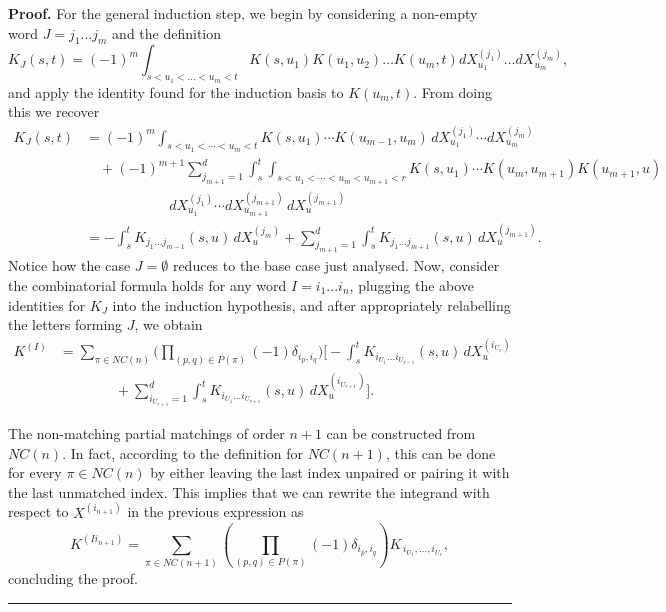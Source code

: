 \documentclass{article}%
\newenvironment{proof}[1][Proof]{\noindent\textbf{#1.} }{\ \rule{0.5em}{0.5em}}
\begin{document}
\begin{proof}
For the general induction step, we begin by considering a non-empty word $J = j_1 \dots j_m$ and the definition
\[
K_{J}(s,t) = (-1)^{m} \int_{s < u_1 < \dots < u_m <t} K(s, u_1)K(u_1, u_2) \dots K(u_{m}, t) dX^{(j_1)}_{u_1}\dots dX^{(j_m)}_{u_m},
\]
and apply the identity found for the induction basis to $K(u_m, t)$. From doing this we recover
\begin{align*}
K_{J}(s,t) &= (-1)^{m}
   \int_{s<u_1<\cdots<u_m<t}
   K(s,u_1)\cdots K(u_{m-1},u_{m})\,
   dX^{(j_1)}_{u_1}\cdots dX^{(j_m)}_{u_m} \\
&\quad
   + (-1)^{m+1}
   \sum_{j_{m+1}=1}^d
   \int_s^t
   \int_{s<u_1<\cdots<u_m<u_{m+1}<r}
   K(s,u_1)\cdots K(u_m,u_{m+1}) K(u_{m+1},u) \\
&\hspace{6em}
   dX^{(j_1)}_{u_1}\cdots dX^{(j_{m+1})}_{u_{m+1}}
   \, dX^{(j_{m+1})}_u \\
&=
   - \int_s^t
     K_{j_1\dots j_{m-1}}(s,u)\,
     dX^{(j_m)}_u
   + \sum_{j_{m+1}=1}^d
     \int_s^t
     K_{j_1\dots j_{m+1}}(s,u)\,
     dX^{(j_{m+1})}_u.
\end{align*}
Notice how the case $J = \emptyset$ reduces to the base case just analysed.\newline
Now, consider the combinatorial formula holds for any word $I = i_1...i_n$, plugging the above identities for $K_J$ into the induction hypothesis, and after appropriately relabelling the letters forming $J$, we obtain
\begin{align*}
K^{(I)}
&=
\sum_{\pi \in NC(n)}
\Bigg(
\prod_{(p,q)\in P(\pi)} (-1)\delta_{i_p,i_q}
\Bigg)
\Bigg[
 - \int_s^t
   K_{i_{U_1}\dots i_{U_{r-1}}}(s,u)\,
   dX^{(i_{U_r})}_u  \\
&\qquad\qquad
 + \sum_{i_{U_{r+1}}=1}^d
   \int_s^t
   K_{i_{U_1}\dots i_{U_{r+1}}}(s,u)\,
   dX^{(i_{U_{r+1}})}_u
\Bigg].
\end{align*}


The non-matching partial matchings of order $n+1$ can be constructed from $NC(n)$. In fact, according to the definition for $NC(n+1)$, this can be done for every  $\pi \in NC(n)$ by either leaving the last index unpaired or pairing it with the last unmatched index. This implies that we can rewrite the integrand with respect to $X^{(i_{n+1})}$ in the previous expression as
    \[
K^{(Ii_{n+1})}
=
\sum_{\pi \in NC(n+1)}
\left(
\prod_{(p,q) \in P(\pi)}  (-1)\delta_{i_p,i_q}
\right)
K_{\,i_{U_1},\ldots,i_{U_r}},
\]
concluding the proof.
\end{proof}
\end{document}
